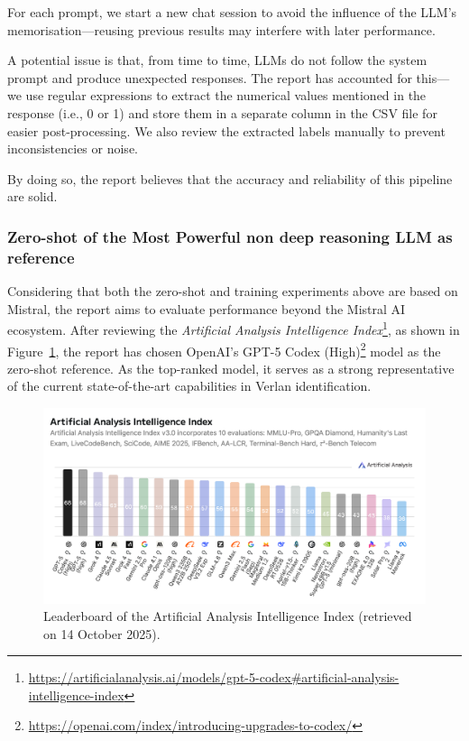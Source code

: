 \documentclass[12pt]{article}
\begin{document}
For each prompt, we start a new chat session to avoid the influence of the LLM’s memorisation\;---\;reusing previous results may interfere with later performance.

A potential issue is that, from time to time, LLMs do not follow the system prompt and produce unexpected responses. The report has accounted for this\;---\;we use regular expressions to extract the numerical values mentioned in the response (i.e., 0 or 1) and store them in a separate column in the CSV file for easier post-processing. We also review the extracted labels manually to prevent inconsistencies or noise.

By doing so, the report believes that the accuracy and reliability of this pipeline are solid.

\subsubsection{Zero-shot of the Most Powerful non deep reasoning LLM as reference}

Considering that both the zero-shot and training experiments above are based on Mistral, the report aims to evaluate performance beyond the Mistral AI ecosystem. After reviewing the \textit{Artificial Analysis Intelligence Index}\footnote{\url{https://artificialanalysis.ai/models/gpt-5-codex\#artificial-analysis-intelligence-index}}, as shown in Figure~\ref{fig:AI_Index}, the report has chosen OpenAI's GPT-5 Codex (High)\footnote{\url{https://openai.com/index/introducing-upgrades-to-codex/}} model as the zero-shot reference. As the top-ranked model, it serves as a strong representative of the current state-of-the-art capabilities in Verlan identification.

\begin{figure}[H]
\centering
\includegraphics[width=15cm]{figures/Artificial Analysis Intelligence Index (14 Oct '25) .png}
\caption{\label{fig:AI_Index}Leaderboard of the Artificial Analysis Intelligence Index (retrieved on 14 October 2025).}
\end{figure}
\end{document}
